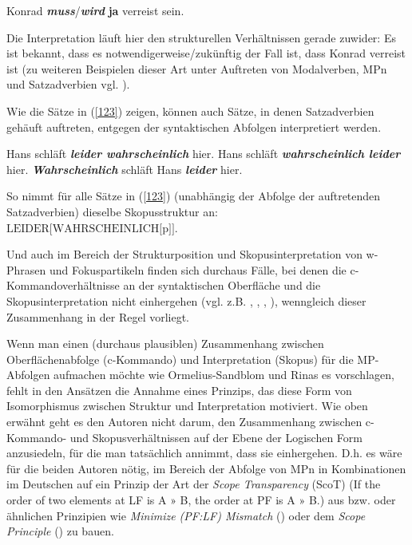 \begin{exe}
	\ex\label{122} 
	Konrad \textit{\textbf{muss}}/\textit{\textbf{wird}} \textbf{ja} verreist sein.
			\hfill\hbox {\citet[100]{Doherty1987}}
\end{exe}
Die Interpretation läuft hier den strukturellen Verhältnissen gerade zuwider: Es ist bekannt, dass es notwendigerweise/zukünftig der Fall ist, dass Konrad verreist ist (zu weiteren Beispielen dieser Art unter Auftreten von Modalverben, MPn und Satzadverbien vgl. \citealt[121-128]{Doherty1985}).				

Wie die Sätze in (\ref{123}) zeigen, können auch Sätze, in denen Satzadverbien  gehäuft auftreten, entgegen der syntaktischen Abfolgen interpretiert werden.

\begin{exe}
	\ex\label{123} 
		\begin{xlist}	
			\ex\label{123a} Hans schläft \textit{\textbf{leider wahrscheinlich}} hier.
			\ex\label{123b} Hans schläft \textit{\textbf{wahrscheinlich leider}} hier.
			\ex\label{123c} \textit{\textbf{Wahrscheinlich}} schläft Hans \textit{\textbf{leider}} hier.
			\hfill\hbox {\citet[205]{Lang1979}}
		\end{xlist}
\end{exe}
So nimmt \citet[205]{Lang1979} für alle Sätze in (\ref{123}) (unabhängig der Abfolge der auftretenden Satzadverbien) dieselbe Skopusstruktur  an:\\ $\textrm{LEIDER[WAHRSCHEINLICH[p]}]$.

Und auch im Bereich der Strukturposition und Skopusinterpretation von w-Phrasen und Fokuspartikeln finden sich durchaus Fälle, bei denen die c-Komman\-doverhältnisse an der syntaktischen Oberfläche und die Skopusinterpretation nicht einhergehen (vgl. z.B. \citealt[94]{Reis1992}, \citealt[29-30]{Brandt1992b}, \citealt[167]{Lohnstein2000}, \citealt[54]{Hoeksema1991}), wenngleich dieser Zusammenhang in der Regel vorliegt.

Wenn man einen (durchaus plausiblen) Zusammenhang zwischen Oberflächenabfolge (c-Kommando) und Interpretation (Skopus) für die MP-Abfolgen aufma\-chen möchte wie Ormelius-Sandblom und Rinas es vorschlagen, fehlt in den Ansätzen die Annahme eines Prinzips, das diese Form von Isomorphismus  zwischen Struktur und Interpretation motiviert. Wie oben erwähnt geht es den Autoren nicht darum, den Zusammenhang zwischen c-Kommando- und Skopusverhältnissen auf der Ebene der Logischen Form anzusiedeln, für die man tatsächlich annimmt, dass sie einhergehen. D.h. es wäre für die beiden Autoren nötig, im Bereich der Abfolge von MPn in Kombinationen im Deutschen auf ein Prinzip der Art der \textit{Scope Transparency} (ScoT)  (If the order of two elements at LF is A » B, the order at PF is A $»$ B.) aus \citet[92]{Wurmbrandt2008} bzw. \citet[373]{Wurmbrandt2012} oder ähnlichen Prinzipien wie \textit{Minimize (PF:LF) Mismatch}  (\citealt{Bobaljik1995, Bobaljik2002}) oder dem \textit{Scope Principle}  (\citealt{Diesing1997}) zu bauen.\\

